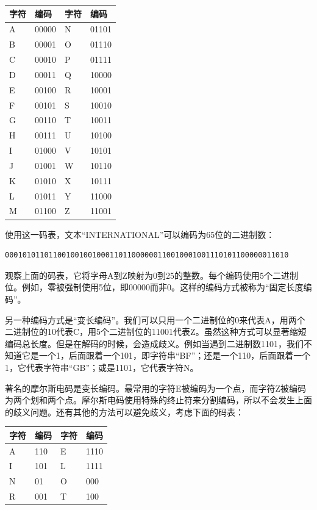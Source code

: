 \documentclass[UTF8]{article}
\begin{document}
\begin{tabular}{l|l||l|l}
字符 & 编码 & 字符 & 编码 \\
\hline
A & 00000 & N & 01101 \\
B & 00001 & O & 01110 \\
C & 00010 & P & 01111 \\
D & 00011 & Q & 10000 \\
E & 00100 & R & 10001 \\
F & 00101 & S & 10010 \\
G & 00110 & T & 10011 \\
H & 00111 & U & 10100 \\
I & 01000 & V & 10101 \\
J & 01001 & W & 10110 \\
K & 01010 & X & 10111 \\
L & 01011 & Y & 11000 \\
M & 01100 & Z & 11001 \\
\hline
\end{tabular}

使用这一码表，文本“INTERNATIONAL”可以编码为65位的二进制数：

\begin{verbatim}
00010101101100100100100011011000000110010001001110101100000011010
\end{verbatim}

观察上面的码表，它将字母A到Z映射为0到25的整数。每个编码使用5个二进制位。例如，零被强制使用5位，即00000而非0。这样的编码方式被称为“固定长度编码”。

另一种编码方式是“变长编码”。我们可以只用一个二进制位的0来代表A，用两个二进制位的10代表C，用5个二进制位的11001代表Z。虽然这种方式可以显著缩短编码总长度。但是在解码的时候，会造成歧义。例如当遇到二进制数1101，我们不知道它是一个1，后面跟着一个101，即字符串“BF”；还是一个110，后面跟着一个1，它代表字符串“GB”；或是1101，它代表字符N。

著名的摩尔斯电码是变长编码。最常用的字符E被编码为一个点，而字符Z被编码为两个划和两个点。摩尔斯电码使用特殊的终止符来分割编码，所以不会发生上面的歧义问题。还有其他的方法可以避免歧义，考虑下面的码表：

\begin{tabular}{l|l||l|l}
字符 & 编码 & 字符 & 编码 \\
\hline
A & 110 & E & 1110 \\
I & 101 & L & 1111 \\
N & 01 & O & 000 \\
R & 001 & T & 100 \\
\hline
\end{tabular}
\end{document}
